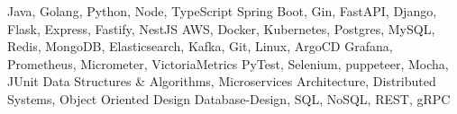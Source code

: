 




\addvspace{-1.5ex}
\begin{cvskills}
    {Java, Golang, Python, Node, TypeScript}
    {Spring Boot, Gin, FastAPI, Django, Flask, Express, Fastify, NestJS}
    {AWS, Docker, Kubernetes, Postgres, MySQL, Redis, MongoDB, Elasticsearch, Kafka, Git, Linux, ArgoCD
    \newline Grafana, Prometheus, Micrometer, VictoriaMetrics}
    {PyTest, Selenium, puppeteer, Mocha, JUnit}
    {Data Structures \& Algorithms, Microservices Architecture, Distributed Systems, Object Oriented Design
    Database-Design, SQL, NoSQL, REST, gRPC}
\end{cvskills}
\addvspace{1.5ex}